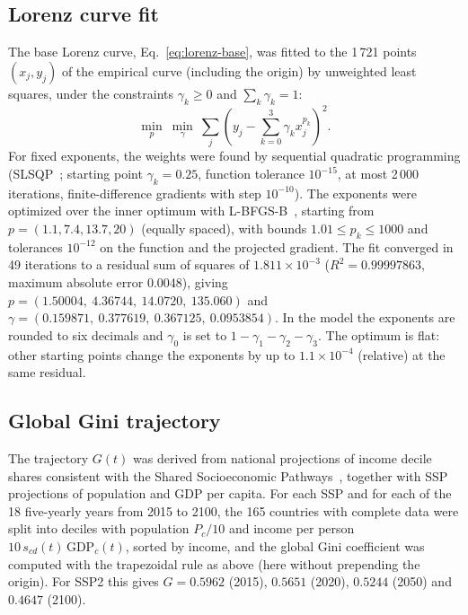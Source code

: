\documentclass[11pt]{article}
\begin{document}
\subsection{Lorenz curve fit}
\label{sec:lorenz-fit}

The base Lorenz curve, Eq.~\eqref{eq:lorenz-base}, was fitted to the 1\,721
points $(x_j, y_j)$ of the empirical curve (including the origin) by
unweighted least squares, under the constraints $\gamma_k\ge0$ and
$\sum_k\gamma_k = 1$:
\begin{equation}
  \min_{p}\ \min_{\gamma}\ \sum_j\left(y_j - \sum_{k=0}^{3}\gamma_k x_j^{p_k}\right)^2 .
\end{equation}
For fixed exponents, the weights were found by sequential quadratic
programming (SLSQP~\cite{Kraft1988}; starting point $\gamma_k = 0.25$, function
tolerance $10^{-15}$, at most 2\,000 iterations, finite-difference gradients
with step $10^{-10}$). The exponents were optimized over the inner optimum
with L-BFGS-B~\cite{Byrd1995}, starting from $p = (1.1, 7.4, 13.7, 20)$
(equally spaced), with bounds $1.01\le p_k\le1000$ and tolerances $10^{-12}$
on the function and the projected gradient. The fit converged in 49
iterations to a residual sum of squares of $1.811\times10^{-3}$
($R^2 = 0.99997863$, maximum absolute error 0.0048), giving
$p = (1.50004,\ 4.36744,\ 14.0720,\ 135.060)$ and
$\gamma = (0.159871,\ 0.377619,\ 0.367125,\ 0.0953854)$. In the model the
exponents are rounded to six decimals and $\gamma_0$ is set to
$1 - \gamma_1 - \gamma_2 - \gamma_3$. The optimum is flat: other starting
points change the exponents by up to $1.1\times10^{-4}$ (relative) at the same
residual.

\subsection{Global Gini trajectory}
\label{sec:gini}

The trajectory $G(t)$ was derived from national projections of income decile
shares consistent with the Shared Socioeconomic Pathways~\cite{Narayan2023},
together with SSP projections of population and GDP per capita.
For each SSP and for each of the 18 five-yearly years from 2015 to 2100, the
165 countries with complete data were split into deciles with population
$P_c/10$ and income per person $10\,s_{cd}(t)\,\mathrm{GDP}_c(t)$, sorted by
income, and the global Gini coefficient was computed with the trapezoidal rule
as above (here without prepending the origin). For SSP2 this gives
$G = 0.5962$ (2015), $0.5651$ (2020), $0.5244$ (2050) and $0.4647$ (2100).
\end{document}
